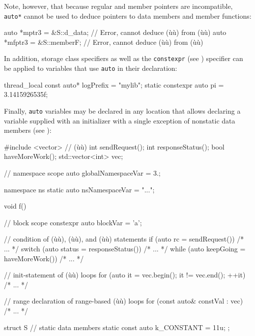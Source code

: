 \noindent Note, however, that because regular and member pointers are
incompatible, \lstinline!auto*! cannot be used to deduce pointers to data
members and member functions:

\begin{emcppslisting}[emcppsbatch=e2]
auto *mptr3  = &S::d_data;   // Error, cannot deduce (ù{}ù) from (ù{}ù)
auto *mfptr3 = &S::memberF;  // Error, cannot deduce (ù{}ù) from (ù{}ù)
\end{emcppslisting}
    
\noindent In addition, storage class specifiers as well as the \lstinline!constexpr!
(see ) specifier can be
applied to variables that use \lstinline!auto! in their declaration:

\begin{emcppslisting}
thread_local     const auto* logPrefix = "mylib";
static constexpr       auto  pi        = 3.1415926535f;
\end{emcppslisting}
    
\noindent Finally, \lstinline!auto! variables may be declared in any location that
allows declaring a variable supplied with an initializer with a single
exception of nonstatic data members (see ):


\begin{emcppshiddenlisting}[emcppsbatch=e3]
#include <vector>     // (ù{}ù)
int sendRequest();
int responseStatus();
bool haveMoreWork();
std::vector<int> vec;
\end{emcppshiddenlisting}
\begin{emcppslisting}[emcppsbatch=e3]
// namespace scope
auto globalNamespaceVar = 3.;

namespace ns
{
    static auto nsNamespaceVar = "...";
}

void f()
{
    // block scope
    constexpr auto blockVar = 'a';

    // condition of (ù{}ù), (ù{}ù), and (ù{}ù) statements
    if     (auto rc        = sendRequest())    { /* ... */ }
    switch (auto status    = responseStatus()) { /* ... */ }
    while  (auto keepGoing = haveMoreWork())   { /* ... */ }

    // init-statement of (ù{}ù) loops
    for (auto it = vec.begin(); it != vec.end(); ++it) { /* ... */ }

    // range declaration of range-based (ù{}ù) loops
    for (const auto& constVal : vec) { /* ... */ }
}

struct S
{
    // static data members
    static const auto k_CONSTANT = 11u;
};
\end{emcppslisting}
    

